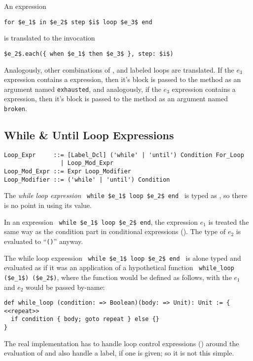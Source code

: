 An expression 
\begin{lstlisting}
for $e_1$ in $e_2$ step $i$ loop $e_3$ end
\end{lstlisting} 
is translated to the invocation
\begin{lstlisting}[deletekeywords={step}]
$e_2$.each({ when $e_1$ then $e_3$ }, step: $i$)
\end{lstlisting} 

Analogously, other combinations of ,  and labeled loops are translated. If the $e_3$ expression contains a  expression, then it's block is passed to the  method as an argument named \lstinline[deletekeywords={exhausted}]{exhausted}, and analogously, if the $e_3$ expression contains a  expression, then it's block is passed to the  method as an argument named \lstinline[deletekeywords={broken}]{broken}.







\subsection{While \& Until Loop Expressions}

\syntax\begin{lstlisting}
Loop_Expr     ::= [Label_Dcl] ('while' | 'until') Condition For_Loop
                | Loop_Mod_Expr
Loop_Mod_Expr ::= Expr Loop_Modifier
Loop_Modifier ::= ('while' | 'until') Condition
\end{lstlisting}

The {\em while loop expression} ~\lstinline!while $e_1$ loop $e_2$ end!~ is typed as , so there is no point in using its value. 

In an expression ~\lstinline!while $e_1$ loop $e_2$ end!, the expression $e_1$ is treated the same way as the condition part in conditional expressions (). The type of $e_2$ is evaluated to ``\lstinline!()!'' anyway.

The while loop expression ~\lstinline!while $e_1$ loop $e_2$ end!~ is alone typed and evaluated as if it was an application of a hypothetical function ~\lstinline!while_loop ($e_1$) ($e_2$)!, where the function  would be defined as follows, with the $e_1$ and $e_2$ would be passed by-name: 
\begin{lstlisting}
def while_loop (condition: => Boolean)(body: => Unit): Unit := {
<<repeat>>
  if condition { body; goto repeat } else {}
}
\end{lstlisting}
The real implementation has to handle loop control expressions () around the evaluation of  and also handle a label, if one is given; so it is not this simple. 

